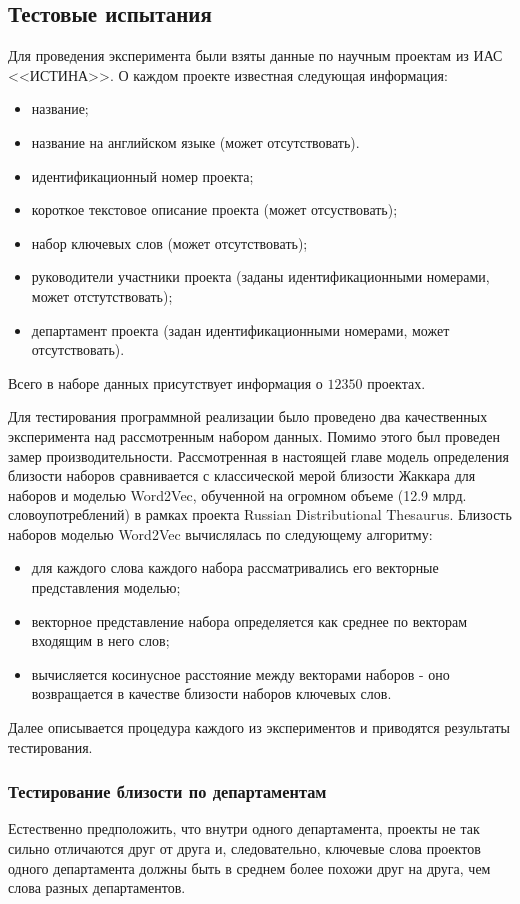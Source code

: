 \subsection{Тестовые испытания}
Для проведения эксперимента были взяты данные по научным проектам из ИАС <<ИСТИНА>>. О каждом проекте известная следующая информация: 
\begin{itemize}
    \item название;
    \item название на английском языке (может отсутствовать).
    \item идентификационный номер проекта;
    \item короткое текстовое описание проекта (может отсуствовать);
    \item набор ключевых слов (может отсутствовать);
    \item руководители участники проекта (заданы идентификационными номерами, может отстутствовать);
    \item департамент проекта (задан идентификационными номерами, может отсутствовать).
\end{itemize}

Всего в наборе данных присутствует информация о $12350$ проектах. 

Для тестирования программной реализации было проведено два качественных эксперимента над рассмотренным набором данных. Помимо этого был проведен замер производительности. Рассмотренная в настоящей главе модель определения близости наборов сравнивается с классической мерой близости Жаккара для наборов и моделью Word2Vec, обученной на огромном объеме (12.9 млрд. словоупотреблений) в рамках проекта Russian Distributional Thesaurus. Близость наборов моделью Word2Vec вычислялась по следующему алгоритму:
\begin{itemize}
    \item для каждого слова каждого набора рассматривались его векторные представления моделью;
    \item векторное представление набора определяется как среднее по векторам входящим в него слов;
    \item вычисляется косинусное расстояние между векторами наборов - оно возвращается в качестве близости наборов ключевых слов.
\end{itemize}
        
Далее описывается процедура каждого из экспериментов и приводятся результаты тестирования. 

\subsubsection{Тестирование близости по департаментам}
Естественно предположить, что  внутри одного департамента, проекты не так сильно отличаются друг от друга и, следовательно, ключевые слова проектов одного департамента должны быть в среднем более похожи друг на друга, чем слова разных департаментов.


